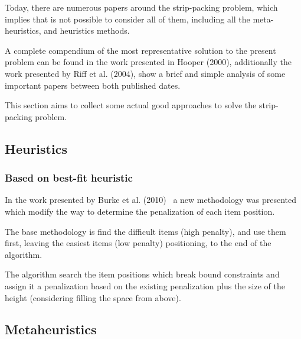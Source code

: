 Today, there are numerous papers around the
strip-packing problem, which implies that is not possible
to consider all of them, including all the meta-heuristics,
and heuristics methods.

A complete compendium of the most representative
solution to the present problem can be found in the work
presented in Hooper (2000)\cite{hooper},
additionally the work presented by Riff et al. (2004)\cite{riff},
show a brief and simple analysis of some important
papers between both published dates.

This section aims to collect some actual good approaches
to solve the strip-packing problem.

\subsection{Heuristics}

\subsubsection{Based on best-fit heuristic}

In the work presented by Burke et al. (2010)~\cite{burke}
a new methodology was presented which modify the
way to determine the penalization of each item position.

The base methodology is find the difficult items (high penalty),
and use them first, leaving the easiest items (low penalty)
positioning, to the end of the algorithm.

The algorithm search the item positions which break bound
constraints and assign it a penalization based on the existing
penalization plus the size of the height (considering filling the space
from above).

%
%

\subsection{Metaheuristics}

